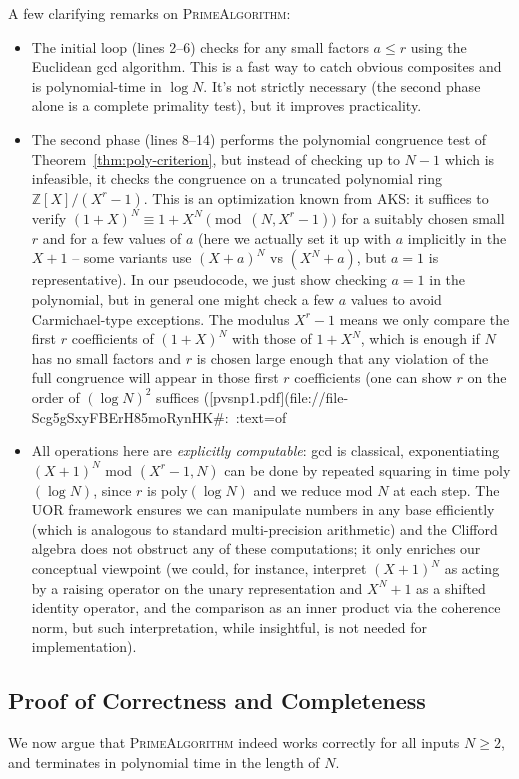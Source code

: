 \documentclass[11pt]{article}
\begin{document}
A few clarifying remarks on \textsc{PrimeAlgorithm}:
\begin{itemize}
    \item The initial loop (lines 2–6) checks for any small factors $a \le r$ using the Euclidean gcd algorithm. This is a fast way to catch obvious composites and is polynomial-time in $\log N$. It’s not strictly necessary (the second phase alone is a complete primality test), but it improves practicality.
    \item The second phase (lines 8–14) performs the polynomial congruence test of Theorem~\ref{thm:poly-criterion}, but instead of checking up to $N-1$ which is infeasible, it checks the congruence on a truncated polynomial ring $\mathbb{Z}[X]/(X^r - 1)$. This is an optimization known from AKS: it suffices to verify $(1+X)^N \equiv 1+X^N \pmod{(N, X^r-1)}$ for a suitably chosen small $r$ and for a few values of $a$ (here we actually set it up with $a$ implicitly in the $X+1$ – some variants use $(X+a)^N$ vs $(X^N + a)$, but $a=1$ is representative). In our pseudocode, we just show checking $a=1$ in the polynomial, but in general one might check a few $a$ values to avoid Carmichael-type exceptions. The modulus $X^r-1$ means we only compare the first $r$ coefficients of $(1+X)^N$ with those of $1+X^N$, which is enough if $N$ has no small factors and $r$ is chosen large enough that any violation of the full congruence will appear in those first $r$ coefficients (one can show $r$ on the order of $(\log N)^2$ suffices ([pvsnp1.pdf](file://file-Scg5gSxyFBErH85moRynHK#:~:text=of%
    \item All operations here are \emph{explicitly computable}: gcd is classical, exponentiating $(X+1)^N$ mod $(X^r-1, N)$ can be done by repeated squaring in time poly$(\log N)$, since $r$ is poly$(\log N)$ and we reduce mod $N$ at each step. The UOR framework ensures we can manipulate numbers in any base efficiently (which is analogous to standard multi-precision arithmetic) and the Clifford algebra does not obstruct any of these computations; it only enriches our conceptual viewpoint (we could, for instance, interpret $(X+1)^N$ as acting by a raising operator on the unary representation and $X^N+1$ as a shifted identity operator, and the comparison as an inner product via the coherence norm, but such interpretation, while insightful, is not needed for implementation).
\end{itemize}

\subsection{Proof of Correctness and Completeness}
We now argue that \textsc{PrimeAlgorithm} indeed works correctly for all inputs $N\ge2$, and terminates in polynomial time in the length of $N$.
\end{document}
